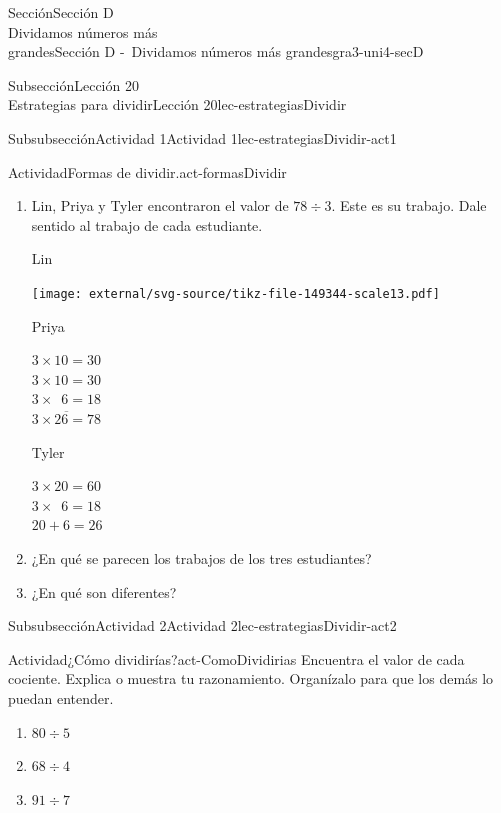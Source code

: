 \begin{sectionptx}{Sección}{{\Large Sección D\\}Dividamos números más\\grandes}{}{Sección D -~Dividamos números más grandes}{}{}{gra3-uni4-secD}
\begin{subsectionptx}{Subsección}{{\normalsize Lección 20\\[-0.05cm]}Estrategias para dividir}{}{Lección 20}{}{}{lec-estrategiasDividir}
\begin{subsubsectionptx}{Subsubsección}{Actividad 1}{}{Actividad 1}{}{}{lec-estrategiasDividir-act1}
\begin{activity}{Actividad}{Formas de dividir.}{act-formasDividir}%
%
\begin{enumerate}
\item{}Lin, Priya y Tyler encontraron el valor de \(78 \div 3\). Este es su trabajo. Dale sentido al trabajo de cada estudiante.%
\par
Lin%
\par
\begin{image}{0}{1}{0}{}%
\texttt{[image: external/svg-source/tikz-file-149344-scale13.pdf]}
\end{image}%
%
\begin{sidebyside}{2}{0}{0}{0}%
\begin{sbspanel}{0.5}%
Priya%
\par
\(3\times 10 = 30\)\\
 \(3\times 10 = 30\)\\
 \(3\times \phantom{0}6 = 18\)\\
 \(\overline {3 \times 26 =78}\)%
\end{sbspanel}%
\begin{sbspanel}{0.5}%
Tyler%
\par
\(3\times 20 = 60\)\\
 \(3\times \phantom{0}6 = 18\)\\
 \(20 + 6 = 26\)%
\end{sbspanel}%
\end{sidebyside}%
\item{}¿En qué se parecen los trabajos de los tres estudiantes?%
\item{}¿En qué son diferentes?%
\end{enumerate}
\end{activity}%
\end{subsubsectionptx}
%
%
\typeout{************************************************}
\typeout{************************************************}
%
\begin{subsubsectionptx}{Subsubsección}{Actividad 2}{}{Actividad 2}{}{}{lec-estrategiasDividir-act2}
\begin{activity}{Actividad}{¿Cómo dividirías?}{act-ComoDividirias}%
Encuentra el valor de cada cociente. Explica o muestra tu razonamiento. Organízalo para que los demás lo puedan entender.%
%
\begin{enumerate}
\item{}\(\displaystyle 80\div 5\)%
\item{}\(\displaystyle 68\div 4\)%
\item{}\(\displaystyle 91\div 7\)%

\end{enumerate}
\end{activity}
\end{subsubsectionptx}
\end{subsectionptx}
\end{sectionptx}
